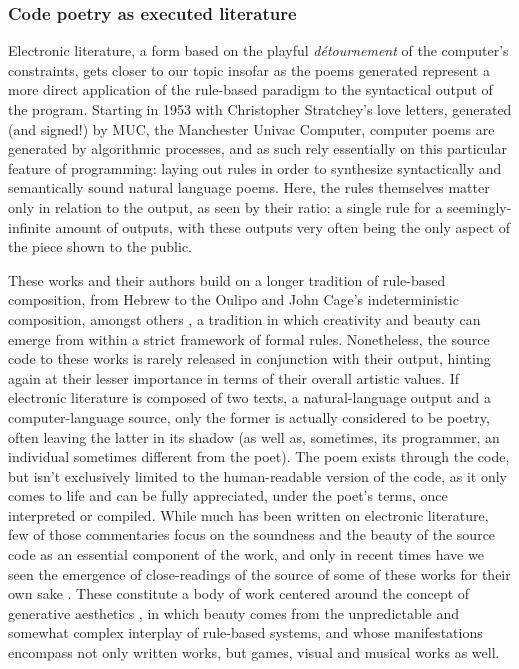 \subsubsection{Code poetry as executed literature}

Electronic literature, a form based on the playful \emph{détournement} of the computer's constraints, gets closer to our topic insofar as the poems generated represent a more direct application of the rule-based paradigm to the syntactical output of the program. Starting in 1953 with Christopher Stratchey's love letters, generated (and signed!) by MUC, the Manchester Univac Computer, computer poems are generated by algorithmic processes, and as such rely essentially on this particular feature of programming: laying out rules in order to synthesize syntactically and semantically sound natural language poems. Here, the rules themselves matter only in relation to the output, as seen by their ratio: a single rule for a seemingly-infinite amount of outputs, with these outputs very often being the only aspect of the piece shown to the public.

These works and their authors build on a longer tradition of rule-based composition, from Hebrew to the Oulipo and John Cage's indeterministic composition, amongst others \citep{cramer_words_2003}, a tradition in which creativity and beauty can emerge from within a strict framework of formal rules. Nonetheless, the source code to these works is rarely released in conjunction with their output, hinting again at their lesser importance in terms of their overall artistic values. If electronic literature is composed of two texts, a natural-language output and a computer-language source, only the former is actually considered to be poetry, often leaving the latter in its shadow (as well as, sometimes, its programmer, an individual sometimes different from the poet). The poem exists through the code, but isn't exclusively limited to the human-readable version of the code, as it only comes to life and can be fully appreciated, under the poet's terms, once interpreted or compiled. While much has been written on electronic literature, few of those commentaries focus on the soundness and the beauty of the source code as an essential component of the work, and only in recent times have we seen the emergence of close-readings of the source of some of these works for their own sake \citep{montfort_10_2014,marino_critical_2020,brock_rhetorical_2019}. These constitute a body of work centered around the concept of generative aesthetics \citep{goriunova_read_2005}, in which beauty comes from the unpredictable and somewhat complex interplay of rule-based systems, and whose manifestations encompass not only written works, but games, visual and musical works as well.


